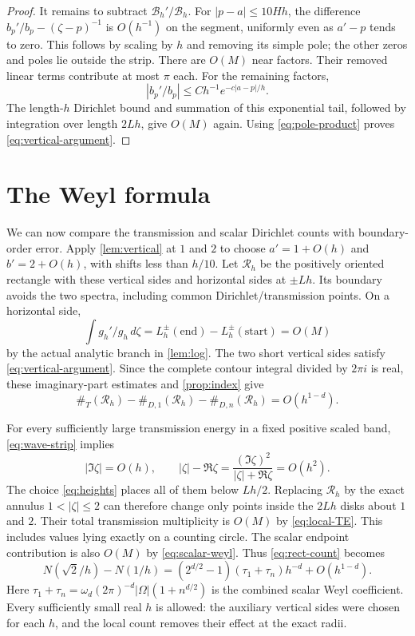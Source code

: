 \documentclass[11pt,a4paper]{article}
\theoremstyle{remark}
\numberwithin{equation}{section}
\begin{document}
\begin{proof}
It remains to subtract $\mathcal B_h'/\mathcal B_h$.
For $|p-a|\le10Hh$, the difference
$b_p'/b_p-(\zeta-p)^{-1}$ is $O(h^{-1})$ on the segment,
uniformly even as $a'-p$ tends to zero. This follows by scaling by
$h$ and removing its simple pole; the other zeros and poles lie
outside the strip. There are $O(M)$ near factors. Their removed
linear terms contribute at most $\pi$ each. For the remaining factors,
\[
 |b_p'/b_p|\le Ch^{-1}e^{-c|a-p|/h}.
\]
The length-$h$ Dirichlet bound and summation of this exponential tail,
followed by integration over length $2Lh$, give $O(M)$ again.
Using \eqref{eq:pole-product} proves \eqref{eq:vertical-argument}.
\end{proof}

\section{The Weyl formula}\label{sec:count}

We can now compare the transmission and scalar Dirichlet counts with
boundary-order error. Apply \cref{lem:vertical} at $1$ and $2$ to
choose $a'=1+O(h)$ and $b'=2+O(h)$, with shifts less than $h/10$.
Let $\mathcal R_h$ be the positively oriented rectangle with these
vertical sides and horizontal sides at $\pm Lh$. Its boundary avoids
the two spectra, including common Dirichlet/transmission points.
On a horizontal side,
\[
 \int g_h'/g_h\,d\zeta=L_h^\pm(\text{end})-L_h^\pm(\text{start})
 =O(M)
\]
by the actual analytic branch in \cref{lem:log}. The two short vertical
sides satisfy \eqref{eq:vertical-argument}. Since the complete contour
integral divided by $2\pi i$ is real, these imaginary-part estimates
and \cref{prop:index} give
\begin{equation}\label{eq:rect-count}
 \#_T(\mathcal R_h)-\#_{D,1}(\mathcal R_h)-\#_{D,n}(\mathcal R_h)
 =O(h^{1-d}).
\end{equation}

For every sufficiently large transmission energy in a fixed positive
scaled band, \eqref{eq:wave-strip} implies
\begin{equation}\label{eq:radial-real}
 |\Im\zeta|=O(h),\qquad
 |\zeta|-\Re\zeta=
 \frac{(\Im\zeta)^2}{|\zeta|+\Re\zeta}=O(h^2).
\end{equation}
The choice \eqref{eq:heights} places all of them below $Lh/2$.
Replacing $\mathcal R_h$ by the exact annulus
$1<|\zeta|\le2$ can therefore change only points inside the
$2Lh$ disks about $1$ and $2$. Their total transmission multiplicity
is $O(M)$ by \eqref{eq:local-TE}. This includes values lying exactly
on a counting circle. The scalar endpoint contribution is also $O(M)$ by
\eqref{eq:scalar-weyl}. Thus \eqref{eq:rect-count} becomes
\begin{equation}\label{eq:annular}
 N(\sqrt2/h)-N(1/h)
 =(2^{d/2}-1)(\tau_1+\tau_n)h^{-d}+O(h^{1-d}).
\end{equation}
Here $\tau_1+\tau_n=\omega_d(2\pi)^{-d}|\Omega|(1+n^{d/2})$ is
the combined scalar Weyl coefficient. Every sufficiently small real $h$ is allowed: the auxiliary vertical
sides were chosen for each $h$, and the local count removes their
effect at the exact radii.
\end{document}
